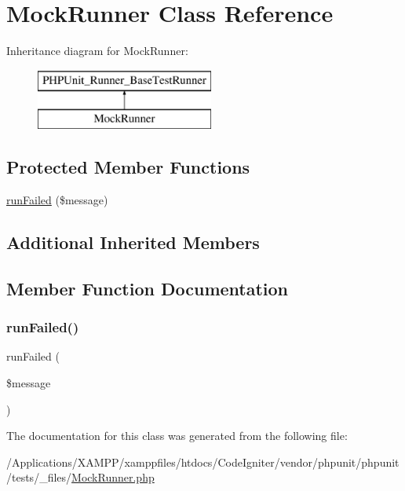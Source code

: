 \hypertarget{class_mock_runner}{}\section{Mock\+Runner Class Reference}
\label{class_mock_runner}
Inheritance diagram for Mock\+Runner\+:\begin{figure}[H]
\begin{center}
\leavevmode
\includegraphics[height=2.000000cm]{class_mock_runner}
\end{center}
\end{figure}
\subsection*{Protected Member Functions}
\begin{DoxyCompactItemize}
\item 
\mbox{\hyperlink{class_mock_runner_a51ed3bece021dbcaad0aa7a8c911de39}{run\+Failed}} (\$message)
\end{DoxyCompactItemize}
\subsection*{Additional Inherited Members}


\subsection{Member Function Documentation}
\mbox{\label{class_mock_runner_a51ed3bece021dbcaad0aa7a8c911de39}} 
\subsubsection{\texorpdfstring{run\+Failed()}{runFailed()}}
{\footnotesize\ttfamily run\+Failed (\begin{DoxyParamCaption}\item[{}]{\$message }\end{DoxyParamCaption})\hspace{0.3cm}{\ttfamily [protected]}}



The documentation for this class was generated from the following file\+:\begin{DoxyCompactItemize}
\item 
/\+Applications/\+X\+A\+M\+P\+P/xamppfiles/htdocs/\+Code\+Igniter/vendor/phpunit/phpunit/tests/\+\_\+files/\mbox{\hyperlink{_mock_runner_8php}{Mock\+Runner.\+php}}\end{DoxyCompactItemize}
